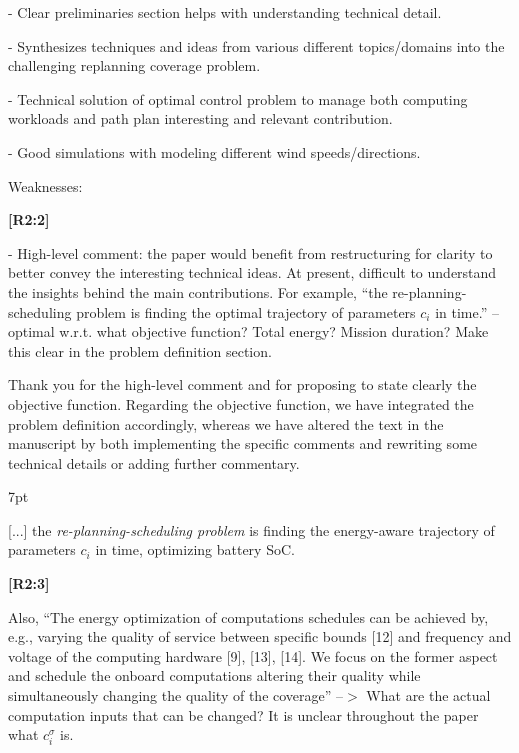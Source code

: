 \documentclass[10pt]{letter}
\newenvironment{formal}{%
  \def\FrameCommand{%
    \hspace{1pt}%
    {\color{red}\vrule width 2pt}%
    {\color{formalshade}\vrule width 4pt}%
    \colorbox{formalshade}%
  }%
  \MakeFramed{\advance\hsize-\width\FrameRestore}%
  \noindent\hspace{-4.55pt}%
  \begin{adjustwidth}{}{7pt}%
  \vspace{2pt}\vspace{2pt}%
}
{%
  \vspace{2pt}\end{adjustwidth}\endMakeFramed%
}
\begin{document}
- Clear preliminaries section helps with understanding technical detail.

- Synthesizes techniques and ideas from various different topics/domains into the challenging replanning coverage problem.

- Technical solution of optimal control problem to manage both computing workloads and path plan interesting and relevant contribution.
  
- Good simulations with modeling different wind speeds/directions.

\vspace{2em}

Weaknesses:

  
{\hspace*{-4.5em}\textbf{[R2:2]}\vspace*{-1.9em}}
  
- High-level comment: the paper would benefit from restructuring for clarity to better convey the interesting technical ideas. At present, difficult to understand the insights behind the main contributions. For example, ``the re-planning-scheduling problem is finding the optimal trajectory of parameters $c_i$ in time.'' -- optimal w.r.t. what objective function? Total energy? Mission duration? Make this clear in the problem definition section. 
  
{\color{blue} 

{\hspace*{-4.5em}{[R2:2]}\vspace*{-1.9em}}

Thank you for the high-level comment and for proposing to state clearly the objective function. Regarding the objective function, we have integrated the problem definition accordingly, whereas we have altered the text in the manuscript by both implementing the specific comments and rewriting some technical details or adding further commentary. 

\begin{formal}
  {\color{black} [...] the \emph{re-planning-scheduling problem} is finding the {\color{blue}energy-aware} trajectory of parameters $c_i$ in time{\color{blue}, optimizing battery SoC}.}
  \vspace*{1ex}
\end{formal}
}
  
  {\hspace*{-4.5em}\textbf{[R2:3]}\vspace*{-1.9em}}

  Also, ``The energy optimization of computations schedules can be achieved by, e.g., varying the quality of service between specific bounds [12] and frequency and voltage of the computing hardware [9], [13], [14]. We focus on the former aspect and schedule the onboard computations altering their quality while simultaneously changing the quality of the coverage'' --$>$ What are the actual computation inputs that can be changed? It is unclear throughout the paper what $c_i^\sigma$ is. 
  
\end{document}
